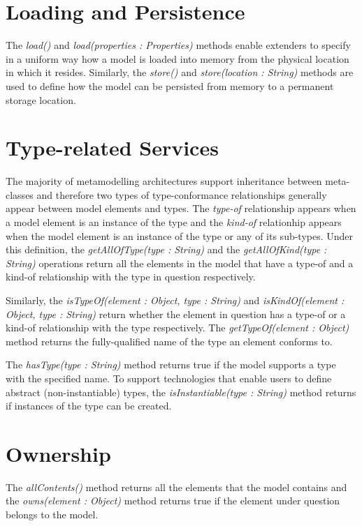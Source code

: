 \section{Loading and Persistence}

The \emph{load()} and \emph{load(properties : Properties)} methods enable extenders to specify in a uniform way how a model is loaded into memory from the physical location in which it resides. Similarly, the \emph{store()} and \emph{store(location : String)} methods are used to define how the model can be persisted from memory to a permanent storage location.

\section{Type-related Services}

The majority of metamodelling architectures support inheritance between meta-classes and therefore two types of type-conformance relationships generally appear between model elements and types. The \emph{type-of} relationship appears when a model element is an instance of the type and the \emph{kind-of} relationhip appears when the model element is an instance of the type or any of its sub-types. Under this definition, the \emph{getAllOfType(type : String)} and the \emph{getAllOfKind(type : String)} operations return all the elements in the model that have a type-of and a kind-of relationship with the type in question respectively.

Similarly, the \emph{isTypeOf(element : Object, type : String)} and \emph{isKindOf(element : Object, type : String)} return whether the element in question has a type-of or a kind-of relationship with the type respectively. The \emph{getTypeOf(element : Object)} method returns the fully-qualified name of the type an element conforms to.

The \emph{hasType(type : String)} method returns true if the model supports a type with the specified name. To support technologies that enable users to define abstract (non-instantiable) types, the \emph{isInstantiable(type : String)} method returns if instances of the type can be created.

\section{Ownership}

The \emph{allContents()} method returns all the elements that the model contains and the \emph{owns(element : Object)} method returns true if the element under question belongs to the model.

